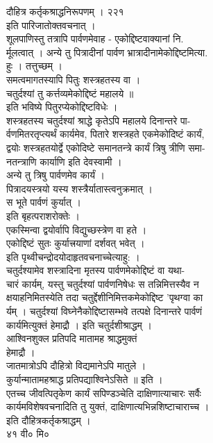 \documentclass[11pt, openany]{book}
\begin{document}
{{{{{{{{{{{{{{{{{{{{{{{{{{{{{{{{{{{{{{{{{{{{{{{{{{{{{{{{{{{{{{{{{{{{{{{{{{{{{{{{{{{{{{{{{{{{{{{{{{{{{ दौहित्र कर्तृकश्राद्धनिरूपणम् । २२१\\
इति पारिजातोक्तवचनात् ।\\
शूलपाणिस्तु तत्रापि पार्वणमेवाह - एकोद्दिष्टवाक्यानां नि.\\
र्मूलत्वात् । अन्ये तु पित्रादीनां पार्वण
भ्रात्रादीनामेकोद्दिष्टमित्या.\\
हुः । तत्तुच्छम् ।\\
समत्वमागतस्यापि पितुः शस्त्रहतस्य वा ।\\
चतुर्दश्यां तु कर्त्तव्यमेकोद्दिष्टं महालये ॥\\
इति भविष्ये पितुरप्येकोद्दिष्टविधेः ।\\
शस्त्रहतस्य चतुर्दश्यां श्राद्धे कृतेऽपि महालये दिनान्तरे पा-\\
र्वणमितरतृप्त्यर्थं कार्यमेव, पितारे शस्त्रहते एकमेकोदिष्टं
}{कार्यं}{,\\
द्वयोः शस्त्रहतयोर्द्वे एकोदिष्टे समानतन्त्रे कार्यं त्रिषु त्रीणि
समा-\\
नतन्त्राणि कार्याणि इति देवस्वामी ।\\
अन्ये तु त्रिषु पार्वणमेव }{कार्यं}{ ।\\
पित्रादयस्त्रयो यस्य शस्त्रैर्यातास्त्वनुक्रमात् ।\\
स भूते पार्वणं कुर्यात् ।\\
इति बृहत्पराशरोक्तेः ।\\
एकस्मिन्वा द्वयोर्वापि विद्युच्छस्त्रेण वा हते ।\\
एकोद्दिष्टं सुतः कुर्यात्त्रयाणां दर्शवत् भवेत् ।\\
इति पृथ्वीचन्द्रोदयोदाहृतवचनाच्चेत्याहु: ।\\
चतुर्दश्यामेव शस्त्रादिना मृतस्य पार्वणमेकोद्दिष्टं वा यथा-\\
चारं कार्यम्, यस्तु चतुर्दश्यां पार्वणनिषेधः स तन्निमित्तस्यैव न\\
क्षयाहनिमितस्येति तदा चतुर्द्देशीनिमित्तकमेकोद्दिष्ट 'पृथग्वा का\\
र्यम् । चतुर्दश्यां विघ्नेनैकोद्दिष्टासम्भवे तत्पक्षे दिनान्तरे
पार्वणं\\
कार्यमित्युक्तं हेमाद्रौ । इति चतुर्दशीश्राद्धम् ।\\
आश्विनशुक्ल प्रतिपदि मातामह श्राद्धमुक्तं\\
हेमाद्रौ ।\\
जातमात्रोऽपि दौहित्रो विद्यमानेऽपि मातुले ।\\
कुर्यान्मातामहश्राद्ध प्रतिपद्याश्विनेऽसिते ॥ इति ।\\
एतच्च जीवत्पितृकेण }{कार्यं}{ सपिण्डञ्चेति दाक्षिणात्याचारः सर्वैः\\
कार्यमविशेषवचनादिति तु युक्तं, दाक्षिणात्यभिन्नशिष्टाचाराच्च ।\\
इति दौहित्रकर्तृकश्राद्धम् ।\\
४१ वी० मि०\\


}}}}}}}}}}}}}}}}}}}}}}}}}}}}}}}}}}}}}}}}}}}}}}}}}}}}}}}}}}}}}}}}}}}}}}}}}}}}}}}}}}}}}}}}}}}}}}}}}}}}}
\end{document}
